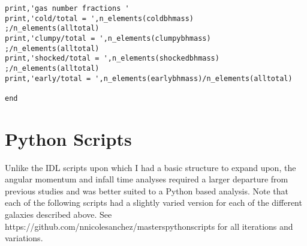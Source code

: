 \documentclass[12pt,headA,chapB]{fiskthesis}
\begin{document}
\begin{verbatim}
print,'gas number fractions '
print,'cold/total = ',n_elements(coldbhmass)
;/n_elements(alltotal)
print,'clumpy/total = ',n_elements(clumpybhmass)
;/n_elements(alltotal)
print,'shocked/total = ',n_elements(shockedbhmass)
;/n_elements(alltotal)
print,'early/total = ',n_elements(earlybhmass)/n_elements(alltotal)

end
\end{verbatim}

\section{Python Scripts}
Unlike the IDL scripts upon which I had a basic structure to expand upon, the angular momentum and infall time analyses required a larger departure from previous studies and was better suited to a Python based analysis. Note that each of the following scripts had a slightly varied version for each of the different galaxies described above. See https://github.com/nnicolesanchez/masterspythonscripts for all iterations and variations.
\end{document}
